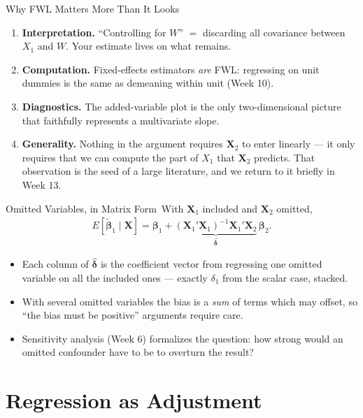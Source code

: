 \documentclass[aspectratio=169,11pt,xcolor=dvipsnames]{beamer}
\newcommand{\E}{E}
\newcommand{\X}{\bm{X}}
\newcommand{\adv}{\,\raisebox{0.6pt}{\textcolor{accent}{$\bigstar$}}}
\begin{document}
\begin{frame}{Why FWL Matters More Than It Looks}
\begin{enumerate}\itemsep6pt
  \item \textbf{Interpretation.} ``Controlling for $W$'' $=$ discarding all
        covariance between $X_1$ and $W$. Your estimate lives on what remains.
  \item \textbf{Computation.} Fixed-effects estimators \emph{are} FWL: regressing
        on unit dummies is the same as demeaning within unit (Week 10).
  \item \textbf{Diagnostics.} The added-variable plot is the only two-dimensional
        picture that faithfully represents a multivariate slope.
  \item \textbf{Generality.} Nothing in the argument requires $\X_2$ to enter
        linearly --- it only requires that we can compute the part of $X_1$ that
        $\X_2$ predicts. That observation is the seed of a large literature, and
        we return to it briefly in Week 13.
\end{enumerate}
\end{frame}

\begin{frame}{Omitted Variables, in Matrix Form\adv}
With $\X_1$ included and $\X_2$ omitted,
\begin{align*}
  \E[\tilde{\bm\beta}_1 \mid \X]
  = \bm\beta_1 + \underbrace{(\X_1'\X_1)^{-1}\X_1'\X_2}_{\hat{\bm\delta}}\,\bm\beta_2 .
\end{align*}
\begin{itemize}\itemsep4pt
  \item Each column of $\hat{\bm\delta}$ is the coefficient vector from regressing
        one omitted variable on all the included ones --- exactly $\delta_1$ from
        the scalar case, stacked.
  \item With several omitted variables the bias is a \emph{sum} of terms which may
        offset, so ``the bias must be positive'' arguments require care.
  \item Sensitivity analysis (Week 6) formalizes the question: how strong would an
        omitted confounder have to be to overturn the result?
\end{itemize}
\end{frame}

\section[Adjustment]{Regression as Adjustment}
\begin{frame}\sectionpage\end{frame}
\end{document}
